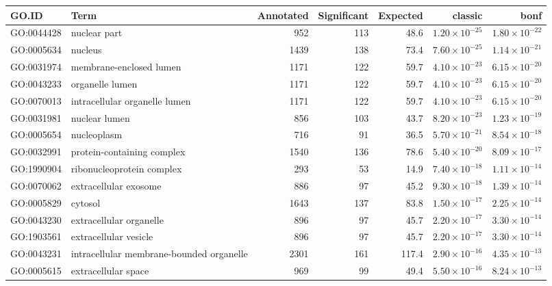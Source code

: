 \begin{table}[ht]
\centering
\begin{adjustbox}{max width=\textwidth}
\begin{tabular}{llrrrrr}
  \hline
GO.ID & Term & Annotated & Significant & Expected & classic & bonf \\ 
  \hline
GO:0044428 & nuclear part & 952 & 113 & 48.6 & $1.20 \times 10^{-25}$ & $1.80 \times 10^{-22}$ \\ 
  GO:0005634 & nucleus & 1439 & 138 & 73.4 & $7.60 \times 10^{-25}$ & $1.14 \times 10^{-21}$ \\ 
  GO:0031974 & membrane-enclosed lumen & 1171 & 122 & 59.7 & $4.10 \times 10^{-23}$ & $6.15 \times 10^{-20}$ \\ 
  GO:0043233 & organelle lumen & 1171 & 122 & 59.7 & $4.10 \times 10^{-23}$ & $6.15 \times 10^{-20}$ \\ 
  GO:0070013 & intracellular organelle lumen & 1171 & 122 & 59.7 & $4.10 \times 10^{-23}$ & $6.15 \times 10^{-20}$ \\ 
  GO:0031981 & nuclear lumen & 856 & 103 & 43.7 & $8.20 \times 10^{-23}$ & $1.23 \times 10^{-19}$ \\ 
  GO:0005654 & nucleoplasm & 716 & 91 & 36.5 & $5.70 \times 10^{-21}$ & $8.54 \times 10^{-18}$ \\ 
  GO:0032991 & protein-containing complex & 1540 & 136 & 78.6 & $5.40 \times 10^{-20}$ & $8.09 \times 10^{-17}$ \\ 
  GO:1990904 & ribonucleoprotein complex & 293 & 53 & 14.9 & $7.40 \times 10^{-18}$ & $1.11 \times 10^{-14}$ \\ 
  GO:0070062 & extracellular exosome & 886 & 97 & 45.2 & $9.30 \times 10^{-18}$ & $1.39 \times 10^{-14}$ \\ 
  GO:0005829 & cytosol & 1643 & 137 & 83.8 & $1.50 \times 10^{-17}$ & $2.25 \times 10^{-14}$ \\ 
  GO:0043230 & extracellular organelle & 896 & 97 & 45.7 & $2.20 \times 10^{-17}$ & $3.30 \times 10^{-14}$ \\ 
  GO:1903561 & extracellular vesicle & 896 & 97 & 45.7 & $2.20 \times 10^{-17}$ & $3.30 \times 10^{-14}$ \\ 
  GO:0043231 & intracellular membrane-bounded organelle & 2301 & 161 & 117.4 & $2.90 \times 10^{-16}$ & $4.35 \times 10^{-13}$ \\ 
  GO:0005615 & extracellular space & 969 & 99 & 49.4 & $5.50 \times 10^{-16}$ & $8.24 \times 10^{-13}$ \\ 

\end{tabular}
\end{adjustbox}
\end{table}
